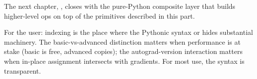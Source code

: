 The next chapter, , closes
 with the pure-Python composite layer
that builds higher-level ops on top of the primitives described in
this part.

\begin{lucidnote}
For the user: indexing is the place where the Pythonic syntax
 or  hides substantial machinery.
The basic-vs-advanced distinction matters when performance is at
stake (basic is free, advanced copies); the autograd-version
interaction matters when in-place assignment intersects with
gradients. For most use, the syntax is transparent.
\end{lucidnote}
